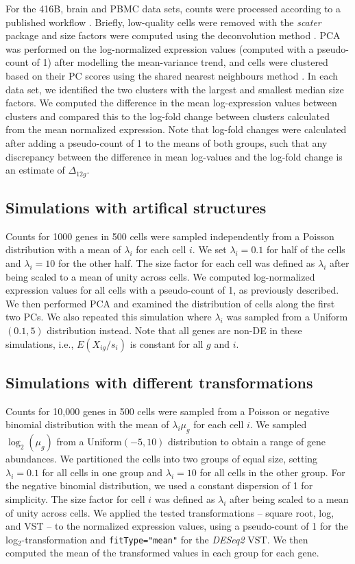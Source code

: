 \documentclass[10pt,letterpaper]{article}
\newcommand\code[1]{{\small\texttt{#1}}}
\begin{document}
For the 416B, brain and PBMC data sets, counts were processed according to a published workflow \cite{lun2016stepbystep}.
Briefly, low-quality cells were removed with the \emph{scater} package \cite{mccarthy2017scater} and size factors were computed using the deconvolution method \cite{lun2016pooling}.
PCA was performed on the log-normalized expression values (computed with a pseudo-count of 1) after modelling the mean-variance trend, 
and cells were clustered based on their PC scores using the shared nearest neighbours method \cite{xu2015identification}.
In each data set, we identified the two clusters with the largest and smallest median size factors.
We computed the difference in the mean log-expression values between clusters and compared this to the log-fold change between clusters calculated from the mean normalized expression.
Note that log-fold changes were calculated after adding a pseudo-count of 1 to the means of both groups,
such that any discrepancy between the difference in mean log-values and the log-fold change is an estimate of $\Delta_{12g}$.

\subsection{Simulations with artifical structures}
Counts for 1000 genes in 500 cells were sampled independently from a Poisson distribution with a mean of $\lambda_i$ for each cell $i$. 
We set $\lambda_i=0.1$ for half of the cells and $\lambda_i=10$ for the other half.
The size factor for each cell was defined as $\lambda_i$ after being scaled to a mean of unity across cells.
We computed log-normalized expression values for all cells with a pseudo-count of 1, as previously described.
We then performed PCA and examined the distribution of cells along the first two PCs.
We also repeated this simulation where $\lambda_i$ was sampled from a Uniform$(0.1, 5)$ distribution instead.
Note that all genes are non-DE in these simulations, i.e., $E(X_{ig}/s_i)$ is constant for all $g$ and $i$.

\subsection{Simulations with different transformations}
Counts for 10,000 genes in 500 cells were sampled from a Poisson or negative binomial distribution with the mean of $\lambda_i \mu_g$ for each cell $i$.
We sampled $\log_2(\mu_g)$ from a Uniform$(-5, 10)$ distribution to obtain a range of gene abundances.
We partitioned the cells into two groups of equal size, setting $\lambda_i=0.1$ for all cells in one group and $\lambda_i=10$ for all cells in the other group.
For the negative binomial distribution, we used a constant dispersion of 1 for simplicity.
The size factor for cell $i$ was defined as $\lambda_i$ after being scaled to a mean of unity across cells.
We applied the tested transformations -- square root, log, and VST -- to the normalized expression values, using a pseudo-count of 1 for the log$_2$-transformation and \code{fitType="mean"} for the \textit{DESeq2} VST.
We then computed the mean of the transformed values in each group for each gene.
\end{document}
